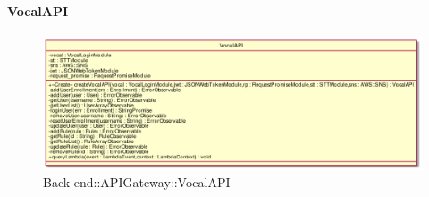 \hypertarget{VocalAPI_label}{\paragraph{VocalAPI}}
\begin{figure}[h]
	\centering
	\includegraphics[width=\textwidth,height=\textheight,keepaspectratio]{images/ClassVocalAPI.png}
	\caption{Back-end::APIGateway::VocalAPI}
\end{figure}
